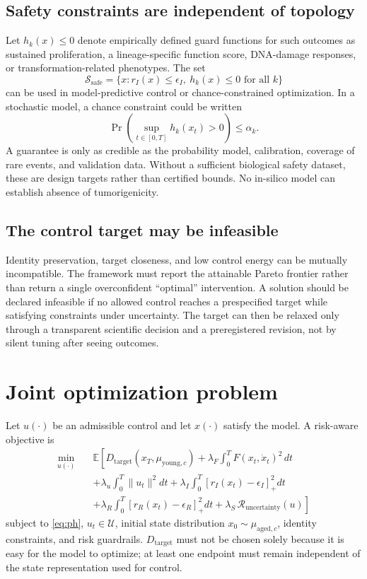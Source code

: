 \documentclass[11pt,a4paper]{article}
\theoremstyle{definition}
\theoremstyle{remark}
\newcommand{\Ssafe}{\mathcal{S}_{\mathrm{safe}}}
\newcommand{\E}{\mathbb{E}}
\newcommand{\pos}[1]{\left[#1\right]_{+}}
\begin{document}
\subsection{Safety constraints are independent of topology}
Let $h_k(x)\leq0$ denote empirically defined guard functions for such outcomes as sustained proliferation, a lineage-specific function score, DNA-damage responses, or transformation-related phenotypes. The set
\begin{equation}
\Ssafe=\{x:r_I(x)\leq\epsilon_I,\ h_k(x)\leq0\text{ for all }k\}
\end{equation}
can be used in model-predictive control or chance-constrained optimization. In a stochastic model, a chance constraint could be written
\begin{equation}
\Pr\left(\sup_{t\in[0,T]}h_k(x_t)>0\right)\leq\alpha_k.
\end{equation}
A guarantee is only as credible as the probability model, calibration, coverage of rare events, and validation data. Without a sufficient biological safety dataset, these are design targets rather than certified bounds. No in-silico model can establish absence of tumorigenicity.

\subsection{The control target may be infeasible}
Identity preservation, target closeness, and low control energy can be mutually incompatible. The framework must report the attainable Pareto frontier rather than return a single overconfident ``optimal'' intervention. A solution should be declared infeasible if no allowed control reaches a prespecified target while satisfying constraints under uncertainty. The target can then be relaxed only through a transparent scientific decision and a preregistered revision, not by silent tuning after seeing outcomes.

\section{Joint optimization problem}
Let $u(\cdot)$ be an admissible control and let $x(\cdot)$ satisfy the model. A risk-aware objective is
\begin{align}
\min_{u(\cdot)}\quad & \E\left[ D_{\mathrm{target}}(x_T,\mu_{\mathrm{young},c}) + \lambda_F\int_0^T F(x_t,\dot{x}_t)^2\,dt \right.\nonumber\\
&\left.+\lambda_u\int_0^T\|u_t\|^2dt+\lambda_I\int_0^T\pos{r_I(x_t)-\epsilon_I}^2dt\right.\nonumber\\
&\left.+\lambda_R\int_0^T\pos{r_R(x_t)-\epsilon_R}^2dt+\lambda_S\,\mathcal{R}_{\mathrm{uncertainty}}(u)\right]
\label{eq:objective_full}
\end{align}
subject to \cref{eq:ph}, $u_t\in\mathcal{U}$, initial state distribution $x_0\sim\mu_{\mathrm{aged},c}$, identity constraints, and risk guardrails. $D_{\mathrm{target}}$ must not be chosen solely because it is easy for the model to optimize; at least one endpoint must remain independent of the state representation used for control.
\end{document}
